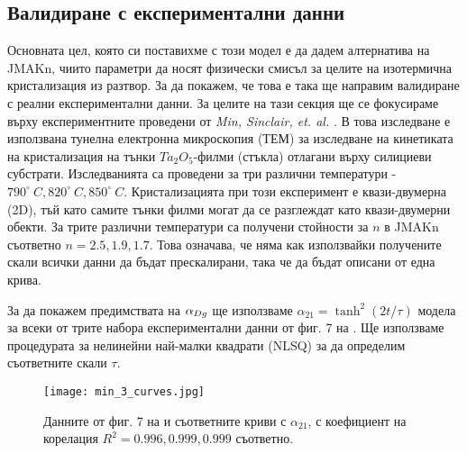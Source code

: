 \subsection{Валидиране с експериментални данни}
\label{sub:experimental_validation}
Основната цел, която си поставихме с този модел е да дадем алтернатива на JMAKn, чиито параметри да носят физически смисъл за целите на изотермична кристализация из разтвор. За да покажем, че това е така ще направим валидиране с реални експериментални данни.
За целите на тази секция ще се фокусираме върху експериментните проведени от \textit{Min, Sinclair, et. al.} \cite{Min2005}.  В  това изследване е използвана тунелна електронна микроскопия (ТЕМ) за изследване на кинетиката на кристализация на тънки $Ta_2O_5$-филми (стъкла) отлагани върху силициеви субстрати. Изследванията са проведени за три различни температури - $790^\circ~C, 820^\circ~C, 850^\circ~C$. Кристализацията при този експеримент е квази-двумерна (2D), тъй като самите тънки филми могат да се разглеждат като квази-двумерни обекти. За трите различни температури са получени стойности за $n$ в JMAKn съответно $n = 2.5, 1.9, 1.7$. Това означава, че няма как използвайки получените скали всички данни да бъдат прескалирани, така че да бъдат описани от една крива.

За да покажем предимствата на $\alpha_{Dg}$ ще използваме $\alpha_{21} = \tanh^2(2t/\tau)$ модела за всеки от трите набора експериментални данни от фиг. 7 на \cite{Min2005}. Ще използваме процедурата за нелинейни най-малки квадрати (NLSQ) за да определим съответните скали $\tau$.
\begin{figure}[hbpt]
    \centering
    \texttt{[image: min\_3\_curves.jpg]}
    \caption{Данните от фиг. 7 на \cite{Min2005} и съответните криви с $\alpha_{21}$, с коефициент на корелация $R^2 = 0.996, 0.999, 0.999$ съответно.}
    \label{fig:a21_min}
\end{figure}

